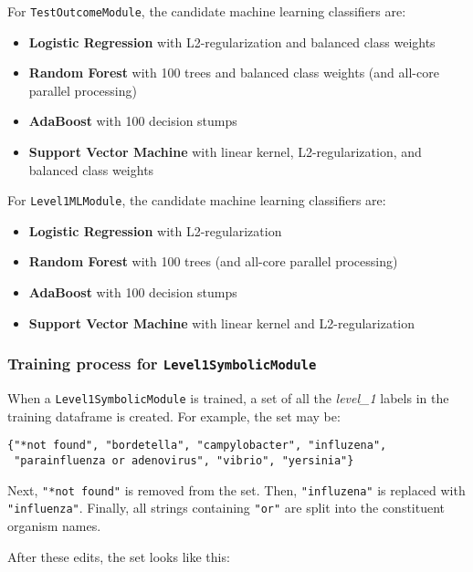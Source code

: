 \documentclass[a4paper]{article}
\begin{document}
For \lstinline{TestOutcomeModule}, the candidate machine learning classifiers are:

\begin{itemize}
\item \textbf{Logistic Regression} with L2-regularization and balanced class weights
\item \textbf{Random Forest} with 100 trees and balanced class weights (and all-core parallel processing)
\item \textbf{AdaBoost} with 100 decision stumps
\item \textbf{Support Vector Machine} with linear kernel, L2-regularization, and balanced class weights
\end{itemize}

For \lstinline{Level1MLModule}, the candidate machine learning classifiers are:

\begin{itemize}
\item \textbf{Logistic Regression} with L2-regularization
\item \textbf{Random Forest} with 100 trees (and all-core parallel processing)
\item \textbf{AdaBoost} with 100 decision stumps
\item \textbf{Support Vector Machine} with linear kernel and L2-regularization
\end{itemize}

\subsubsection{Training process for \lstinline{Level1SymbolicModule}}

When a \lstinline{Level1SymbolicModule} is trained, a set of all the \textit{level\_1} labels in the training dataframe is created. For example, the set may be:

\lstset{language=}
\begin{lstlisting}
{"*not found", "bordetella", "campylobacter", "influzena",
 "parainfluenza or adenovirus", "vibrio", "yersinia"}
\end{lstlisting}
\lstset{language=}

Next, \lstinline{"*not found"} is removed from the set. Then, \lstinline{"influzena"} is replaced with \lstinline{"influenza"}. Finally, all strings containing \lstinline{"or"} are split into the constituent organism names.

After these edits, the set looks like this:
\end{document}
